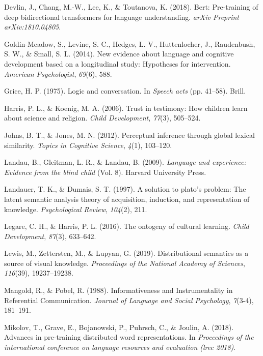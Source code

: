 \documentclass[10pt, letterpaper]{article}
\begin{document}
\leavevmode\hypertarget{ref-devlin2018}{}%
Devlin, J., Chang, M.-W., Lee, K., \& Toutanova, K. (2018). Bert:
Pre-training of deep bidirectional transformers for language
understanding. \emph{arXiv Preprint arXiv:1810.04805}.

\leavevmode\hypertarget{ref-goldin2014}{}%
Goldin-Meadow, S., Levine, S. C., Hedges, L. V., Huttenlocher, J.,
Raudenbush, S. W., \& Small, S. L. (2014). New evidence about language
and cognitive development based on a longitudinal study: Hypotheses for
intervention. \emph{American Psychologist}, \emph{69}(6), 588.

\leavevmode\hypertarget{ref-grice1975}{}%
Grice, H. P. (1975). Logic and conversation. In \emph{Speech acts} (pp.
41--58). Brill.

\leavevmode\hypertarget{ref-harris2006}{}%
Harris, P. L., \& Koenig, M. A. (2006). Trust in testimony: How children
learn about science and religion. \emph{Child Development},
\emph{77}(3), 505--524.

\leavevmode\hypertarget{ref-johns2012}{}%
Johns, B. T., \& Jones, M. N. (2012). Perceptual inference through
global lexical similarity. \emph{Topics in Cognitive Science},
\emph{4}(1), 103--120.

\leavevmode\hypertarget{ref-landau2009}{}%
Landau, B., Gleitman, L. R., \& Landau, B. (2009). \emph{Language and
experience: Evidence from the blind child} (Vol. 8). Harvard University
Press.

\leavevmode\hypertarget{ref-landauer1997}{}%
Landauer, T. K., \& Dumais, S. T. (1997). A solution to plato's problem:
The latent semantic analysis theory of acquisition, induction, and
representation of knowledge. \emph{Psychological Review}, \emph{104}(2),
211.

\leavevmode\hypertarget{ref-legare2016}{}%
Legare, C. H., \& Harris, P. L. (2016). The ontogeny of cultural
learning. \emph{Child Development}, \emph{87}(3), 633--642.

\leavevmode\hypertarget{ref-lewis2019}{}%
Lewis, M., Zettersten, M., \& Lupyan, G. (2019). Distributional
semantics as a source of visual knowledge. \emph{Proceedings of the
National Academy of Sciences}, \emph{116}(39), 19237--19238.

\leavevmode\hypertarget{ref-mangold_1988}{}%
Mangold, R., \& Pobel, R. (1988). Informativeness and Instrumentality in
Referential Communication. \emph{Journal of Language and Social
Psychology}, \emph{7}(3-4), 181--191.

\leavevmode\hypertarget{ref-mikolov2018}{}%
Mikolov, T., Grave, E., Bojanowski, P., Puhrsch, C., \& Joulin, A.
(2018). Advances in pre-training distributed word representations. In
\emph{Proceedings of the international conference on language resources
and evaluation (lrec 2018)}.
\end{document}
